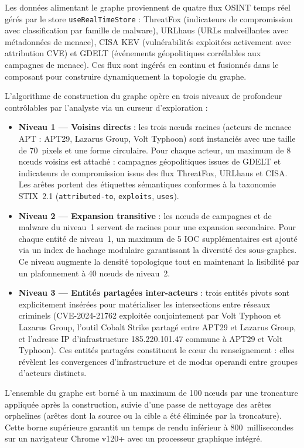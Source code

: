 Les données alimentant le graphe proviennent de quatre flux OSINT temps réel gérés par le store \texttt{useRealTimeStore} : ThreatFox (indicateurs de compromission avec classification par famille de malware), URLhaus (URLs malveillantes avec métadonnées de menace), CISA KEV (vulnérabilités exploitées activement avec attribution CVE) et GDELT (événements géopolitiques corrélables aux campagnes de menace). Ces flux sont ingérés en continu et fusionnés dans le composant pour construire dynamiquement la topologie du graphe.

L'algorithme de construction du graphe opère en trois niveaux de profondeur contrôlables par l'analyste via un curseur d'exploration :

\begin{itemize}
    \item \textbf{Niveau 1 --- Voisins directs} : les trois nœuds racines (acteurs de menace APT : APT29, Lazarus Group, Volt Typhoon) sont instanciés avec une taille de 70~pixels et une forme circulaire. Pour chaque acteur, un maximum de 8 nœuds voisins est attaché : campagnes géopolitiques issues de GDELT et indicateurs de compromission issus des flux ThreatFox, URLhaus et CISA. Les arêtes portent des étiquettes sémantiques conformes à la taxonomie STIX~2.1 (\texttt{attributed-to}, \texttt{exploits}, \texttt{uses}).
    \item \textbf{Niveau 2 --- Expansion transitive} : les nœuds de campagnes et de malware du niveau~1 servent de racines pour une expansion secondaire. Pour chaque entité de niveau~1, un maximum de 5 IOC supplémentaires est ajouté via un index de hachage modulaire garantissant la diversité des sous-graphes. Ce niveau augmente la densité topologique tout en maintenant la lisibilité par un plafonnement à 40 nœuds de niveau~2.
    \item \textbf{Niveau 3 --- Entités partagées inter-acteurs} : trois entités pivots sont explicitement insérées pour matérialiser les intersections entre réseaux criminels (CVE-2024-21762 exploitée conjointement par Volt Typhoon et Lazarus Group, l'outil Cobalt Strike partagé entre APT29 et Lazarus Group, et l'adresse IP d'infrastructure 185.220.101.47 commune à APT29 et Volt Typhoon). Ces entités partagées constituent le cœur du renseignement : elles révèlent les convergences d'infrastructure et de modus operandi entre groupes d'acteurs distincts.
\end{itemize}

L'ensemble du graphe est borné à un maximum de 100 nœuds par une troncature appliquée après la construction, suivie d'une passe de nettoyage des arêtes orphelines (arêtes dont la source ou la cible a été éliminée par la troncature). Cette borne supérieure garantit un temps de rendu inférieur à 800~millisecondes sur un navigateur Chrome v120+ avec un processeur graphique intégré.

